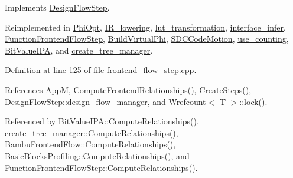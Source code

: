 Implements \hyperlink{classDesignFlowStep_a65bf7bcb603189a7ddcf930c3a9fd7fe}{Design\+Flow\+Step}.



Reimplemented in \hyperlink{classPhiOpt_ae9fa634dbb3dfb91ff7928cc8e48be1c}{Phi\+Opt}, \hyperlink{classIR__lowering_a47d1e16e6d42ddac272d166329013fd4}{I\+R\+\_\+lowering}, \hyperlink{classlut__transformation_a91631c01821c79e4c92f0be5d92af0a4}{lut\+\_\+transformation}, \hyperlink{classinterface__infer_adaf46bd679e004e36be194484e47e54e}{interface\+\_\+infer}, \hyperlink{classFunctionFrontendFlowStep_a1a815ea7885f3e92e414dadd40c43cba}{Function\+Frontend\+Flow\+Step}, \hyperlink{classBuildVirtualPhi_a91ad5ae49dfe85e06f47e88df0dab90d}{Build\+Virtual\+Phi}, \hyperlink{classSDCCodeMotion_aba1edb7d7851104686225cf6aaa92c56}{S\+D\+C\+Code\+Motion}, \hyperlink{classuse__counting_ae50eb0e5cc8c9e0a5c6a630ac6765f59}{use\+\_\+counting}, \hyperlink{classBitValueIPA_a0599406c42da912fe0c0d768bf52e73a}{Bit\+Value\+I\+PA}, and \hyperlink{classcreate__tree__manager_ac60f96c1a28f6faf3480e832f071ceb0}{create\+\_\+tree\+\_\+manager}.



Definition at line 125 of file frontend\+\_\+flow\+\_\+step.\+cpp.



References AppM, Compute\+Frontend\+Relationships(), Create\+Steps(), Design\+Flow\+Step\+::design\+\_\+flow\+\_\+manager, and Wrefcount$<$ T $>$\+::lock().



Referenced by Bit\+Value\+I\+P\+A\+::\+Compute\+Relationships(), create\+\_\+tree\+\_\+manager\+::\+Compute\+Relationships(), Bambu\+Frontend\+Flow\+::\+Compute\+Relationships(), Basic\+Blocks\+Profiling\+::\+Compute\+Relationships(), and Function\+Frontend\+Flow\+Step\+::\+Compute\+Relationships().

